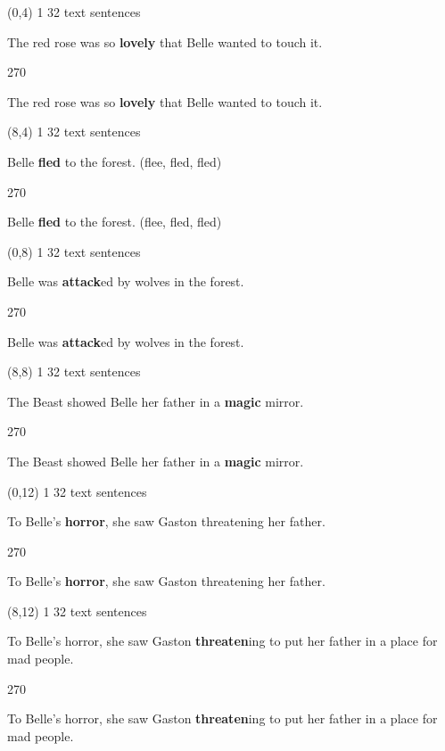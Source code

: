 \documentclass[a4paper]{article}
\newenvironment{itemize*}%
{\begin{itemize}%
 \setlength{\itemsep}{0.5cm}%
 \setlength{\parsep}{0pt}%
 \setlength{\parskip}{0pt}}%
{\end{itemize}}
\newcommand{\mycard}[3]{%
	\small #1 #2
	\par
	\parbox[t][6.8cm][c]{9.5cm}{%
	\par
	\myleft{#3}
	\par
	\myright{#3}
	}
}
\newcommand{\myleft}[1]{%
	\begin{sideways}
	\hspace*{-0.9cm}
		\parbox[t][2.7cm][t]{6.5cm}{%
		\large #1
		}
	\end{sideways}
}
\newcommand{\myright}[1]{%
	\hspace*{6.5cm}
	\begin{turn}{270}
	\hspace*{-7.1cm}
		\parbox[t][2.7cm][t]{6.5cm}{%
		\large #1
		}
	\end{turn}
}
\begin{document}
\begin{textblock}{8}(0,4)
\mycard{1}{32 text sentences}{
\begin{itemize*}
\item The red rose was so \textbf{lovely} that Belle wanted to touch it.
\end{itemize*}
}
\end{textblock}

\begin{textblock}{8}(8,4)
\mycard{1}{32 text sentences}{
\begin{itemize*}
\item Belle \textbf{fled} to the forest. (flee, fled, fled)
\end{itemize*}
}
\end{textblock}

\begin{textblock}{8}(0,8)
\mycard{1}{32 text sentences}{
\begin{itemize*}
\item Belle was \textbf{attack}ed by wolves in the forest.
\end{itemize*}
}
\end{textblock}

\begin{textblock}{8}(8,8)
\mycard{1}{32 text sentences}{
\begin{itemize*}
\item The Beast showed Belle her father in a \textbf{magic} mirror.
\end{itemize*}
}
\end{textblock}

\begin{textblock}{8}(0,12)
\mycard{1}{32 text sentences}{
\begin{itemize*}
\item To Belle's \textbf{horror}, she saw Gaston threatening her father.
\end{itemize*}
}
\end{textblock}

\begin{textblock}{8}(8,12)
\mycard{1}{32 text sentences}{
\begin{itemize*}
\item To Belle's horror, she saw Gaston \textbf{threaten}ing to put her father in a place for mad people.
\end{itemize*}
}
\end{textblock}
\end{document}

